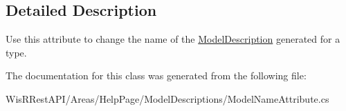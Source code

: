 \subsection{Detailed Description}
Use this attribute to change the name of the \hyperlink{class_wis_r_rest_a_p_i_1_1_areas_1_1_help_page_1_1_model_descriptions_1_1_model_description}{Model\+Description} generated for a type. 



The documentation for this class was generated from the following file\+:\begin{DoxyCompactItemize}
\item 
Wis\+R\+Rest\+A\+P\+I/\+Areas/\+Help\+Page/\+Model\+Descriptions/Model\+Name\+Attribute.\+cs\end{DoxyCompactItemize}
